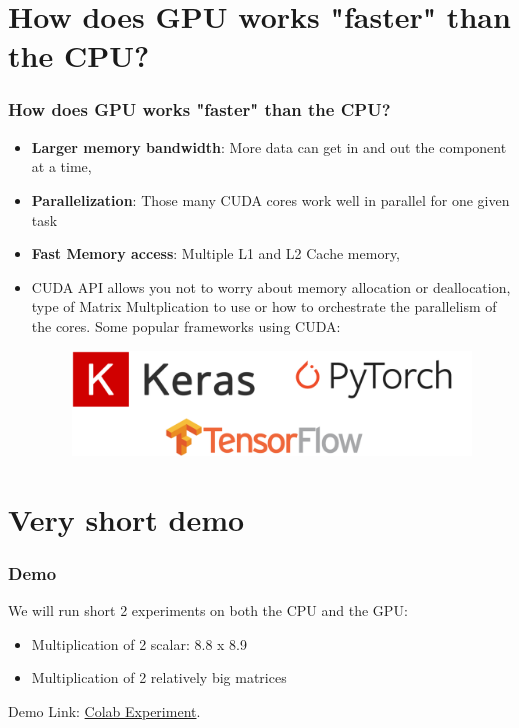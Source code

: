 \documentclass[11pt]{beamer}
\begin{document}
\section{How does GPU works "faster" than the CPU?}
\begin{frame}
	\frametitle{How does GPU works "faster" than the CPU?}
	\begin{itemize}
		\item \textbf{Larger memory bandwidth}: More data can get in and out the component at a time,
		\item \textbf{Parallelization}: Those many CUDA cores work well in parallel for one given task
		\item \textbf{Fast Memory access}: Multiple L1 and L2 Cache memory,
		\item CUDA API allows you not to worry about memory allocation or deallocation, type of Matrix Multplication to use or how to orchestrate the parallelism of the cores. Some popular frameworks using CUDA:
			 \begin{figure}
			\includegraphics[width=\textwidth,height=\textheight,keepaspectratio]{dl_frameworks}
		\end{figure}
	\end{itemize}
\end{frame}

\section{Very short demo}
\begin{frame}
	\frametitle{Demo}
	
	We will run short 2 experiments on both the CPU and the GPU:
	\begin{itemize}
		\item Multiplication of 2 scalar: 8.8 x 8.9
		\item Multiplication of 2 relatively big matrices
	\end{itemize}
	
		\centering
	Demo Link: \href{https://colab.research.google.com/drive/1q32stN5vWQ3XApmu58BczJJy62wTI3Zf#scrollTo=UjuLyp2wMK7D}{Colab Experiment}.
\end{frame}
\end{document}
